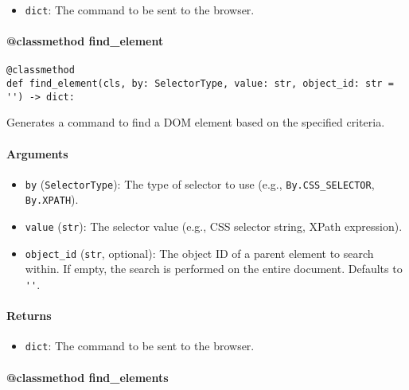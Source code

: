 \documentclass{article}
\begin{document}
\begin{itemize}
    \item \lstinline[style=pythonstyle]|dict|: The command to be sent to the browser.
\end{itemize}

\paragraph{@classmethod find\_element}

\begin{lstlisting}[style=pythonstyle]
@classmethod
def find_element(cls, by: SelectorType, value: str, object_id: str = '') -> dict:
\end{lstlisting}

\noindent Generates a command to find a DOM element based on the specified criteria.

\paragraph{Arguments}

\begin{itemize}
    \item \lstinline[style=pythonstyle]|by| (\lstinline[style=pythonstyle]|SelectorType|): The type of selector to use (e.g., \lstinline[style=pythonstyle]|By.CSS_SELECTOR|, \lstinline[style=pythonstyle]|By.XPATH|).
    \item \lstinline[style=pythonstyle]|value| (\lstinline[style=pythonstyle]|str|): The selector value (e.g., CSS selector string, XPath expression).
    \item \lstinline[style=pythonstyle]|object_id| (\lstinline[style=pythonstyle]|str|, optional): The object ID of a parent element to search within. If empty, the search is performed on the entire document. Defaults to \lstinline[style=pythonstyle]|''|.
\end{itemize}

\paragraph{Returns}

\begin{itemize}
    \item \lstinline[style=pythonstyle]|dict|: The command to be sent to the browser.
\end{itemize}

\paragraph{@classmethod find\_elements}
\end{document}
